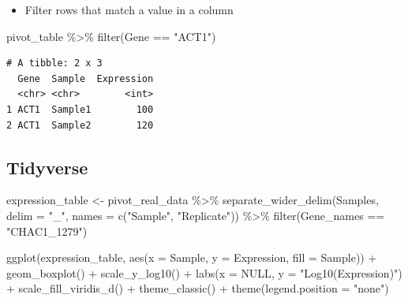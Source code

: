 \documentclass[
  letterpaper,
  DIV=11,
  numbers=noendperiod,
  landscape]{scrartcl}
\newenvironment{Shaded}{\begin{snugshade}}{\end{snugshade}}
\newcommand{\AttributeTok}[1]{\textcolor[rgb]{0.40,0.45,0.13}{#1}}
\newcommand{\ConstantTok}[1]{\textcolor[rgb]{0.56,0.35,0.01}{#1}}
\newcommand{\FunctionTok}[1]{\textcolor[rgb]{0.28,0.35,0.67}{#1}}
\newcommand{\NormalTok}[1]{\textcolor[rgb]{0.00,0.23,0.31}{#1}}
\newcommand{\OtherTok}[1]{\textcolor[rgb]{0.00,0.23,0.31}{#1}}
\newcommand{\SpecialCharTok}[1]{\textcolor[rgb]{0.37,0.37,0.37}{#1}}
\newcommand{\StringTok}[1]{\textcolor[rgb]{0.13,0.47,0.30}{#1}}
\providecommand{\tightlist}{%
  \setlength{\itemsep}{0pt}\setlength{\parskip}{0pt}}\usepackage{longtable,booktabs,array}
\begin{document}
\begin{itemize}
\tightlist
\item
  Filter rows that match a value in a column
\end{itemize}

\begin{Shaded}
\begin{Highlighting}[]
\NormalTok{pivot\_table }\SpecialCharTok{\%\textgreater{}\%}
  \FunctionTok{filter}\NormalTok{(Gene }\SpecialCharTok{==} \StringTok{"ACT1"}\NormalTok{)}
\end{Highlighting}
\end{Shaded}

\begin{verbatim}
# A tibble: 2 x 3
  Gene  Sample  Expression
  <chr> <chr>        <int>
1 ACT1  Sample1        100
2 ACT1  Sample2        120
\end{verbatim}

\hypertarget{section-3}{%
\subsection{}\label{section-3}}

\hypertarget{tidyverse-10}{%
\subsection{Tidyverse}\label{tidyverse-10}}

\begin{Shaded}
\begin{Highlighting}[]
\NormalTok{expression\_table }\OtherTok{\textless{}{-}}\NormalTok{ pivot\_real\_data }\SpecialCharTok{\%\textgreater{}\%}
  \FunctionTok{separate\_wider\_delim}\NormalTok{(Samples, }\AttributeTok{delim =} \StringTok{"\_"}\NormalTok{, }\AttributeTok{names =} \FunctionTok{c}\NormalTok{(}\StringTok{"Sample"}\NormalTok{, }\StringTok{"Replicate"}\NormalTok{)) }\SpecialCharTok{\%\textgreater{}\%}
  \FunctionTok{filter}\NormalTok{(Gene\_names }\SpecialCharTok{==} \StringTok{"CHAC1\_1279"}\NormalTok{)}
\end{Highlighting}
\end{Shaded}

\begin{Shaded}
\begin{Highlighting}[]
\FunctionTok{ggplot}\NormalTok{(expression\_table, }\FunctionTok{aes}\NormalTok{(}\AttributeTok{x =}\NormalTok{ Sample, }\AttributeTok{y =}\NormalTok{ Expression, }\AttributeTok{fill =}\NormalTok{ Sample)) }\SpecialCharTok{+}
  \FunctionTok{geom\_boxplot}\NormalTok{() }\SpecialCharTok{+}
  \FunctionTok{scale\_y\_log10}\NormalTok{() }\SpecialCharTok{+}
  \FunctionTok{labs}\NormalTok{(}\AttributeTok{x =} \ConstantTok{NULL}\NormalTok{,}
       \AttributeTok{y =} \StringTok{"Log10(Expression)"}\NormalTok{) }\SpecialCharTok{+}
  \FunctionTok{scale\_fill\_viridis\_d}\NormalTok{() }\SpecialCharTok{+}
  \FunctionTok{theme\_classic}\NormalTok{() }\SpecialCharTok{+}
  \FunctionTok{theme}\NormalTok{(}\AttributeTok{legend.position =} \StringTok{"none"}\NormalTok{)}
\end{Highlighting}
\end{Shaded}
\end{document}
